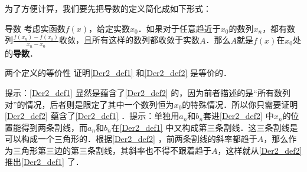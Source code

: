 



为了方便计算，我们要先把导数的定义简化成如下形式：

\begin{definition}{导数}\label{Der2_def2}
考虑实函数$f(x)$，给定实数$x_0$．如果对于任意趋近于$x_0$的数列$x_n$，都有数列$\frac{f(x_n)-f(x_0)}{x_n-x_0}$收敛，且所有这样的数列都收敛于实数$A$．那么$A$就是$f(x)$在$x_0$处的\textbf{导数}．
\end{definition}

\begin{exercise}{两个定义的等价性}
证明\autoref{Der2_def1} 和\autoref{Der2_def2} 是等价的．

提示：\autoref{Der2_def1} 显然是蕴含了\autoref{Der2_def2} 的，因为前者描述的是“所有数列对”的情况，后者则是限定了其中一个数列恒为$x_0$的特殊情况．所以你只需要证明\autoref{Der2_def2} 蕴含了\autoref{Der2_def1} ．提示：单独用$a_n$和$b_n$套进\autoref{Der2_def2} 中$x_n$的位置能得到两条割线，而$a_n$和$b_n$在\autoref{Der2_def1} 中又构成第三条割线．这三条割线是可以构成一个三角形的．根据\autoref{Der2_def2} ，前两条割线的斜率都趋于$A$，那么作为三角形第三边的第三条割线，其斜率也不得不跟着趋于$A$，这样就从\autoref{Der2_def2} 推出\autoref{Der2_def1} 了．
\end{exercise}